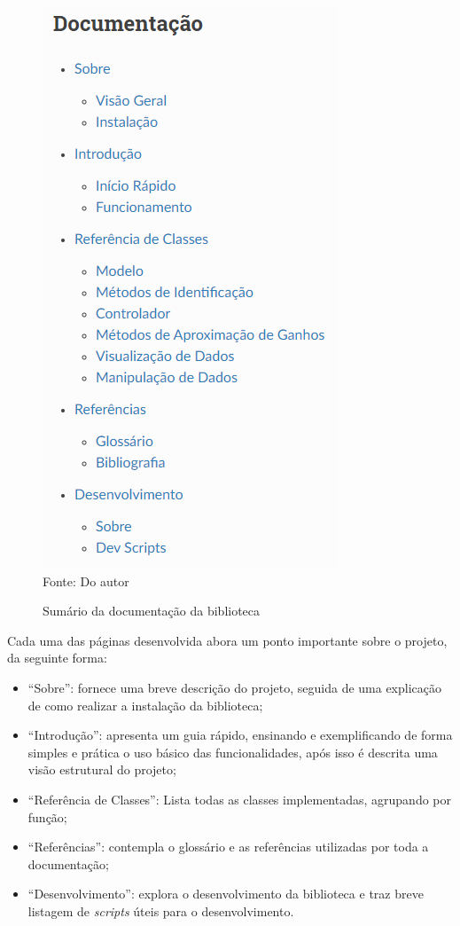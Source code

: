 \begin{figure}[H]
    \centering
    \caption{Sumário da documentação da biblioteca}
    \includegraphics[scale=0.6]{figuras/doc_summary}
    \label{fig:doc_summary}
    \\
    \vspace{0cm}\hspace{0cm}\small{Fonte: Do autor}
\end{figure}

Cada uma das páginas desenvolvida abora um ponto importante sobre o projeto, da seguinte forma:
\begin{itemize}
    \item ``Sobre'': fornece uma breve descrição do projeto, seguida de uma explicação de como realizar a instalação da
    biblioteca;
    \item ``Introdução'': apresenta um guia rápido, ensinando e exemplificando de forma simples e prática o uso básico das
    funcionalidades, após isso é descrita uma visão estrutural do projeto;
    \item ``Referência de Classes'': Lista todas as classes implementadas, agrupando por função;
    \item ``Referências'': contempla o glossário e as referências utilizadas por toda a documentação;
    \item ``Desenvolvimento'': explora o desenvolvimento da biblioteca e traz breve listagem de \textit{scripts} úteis para
    o desenvolvimento.
\end{itemize}



